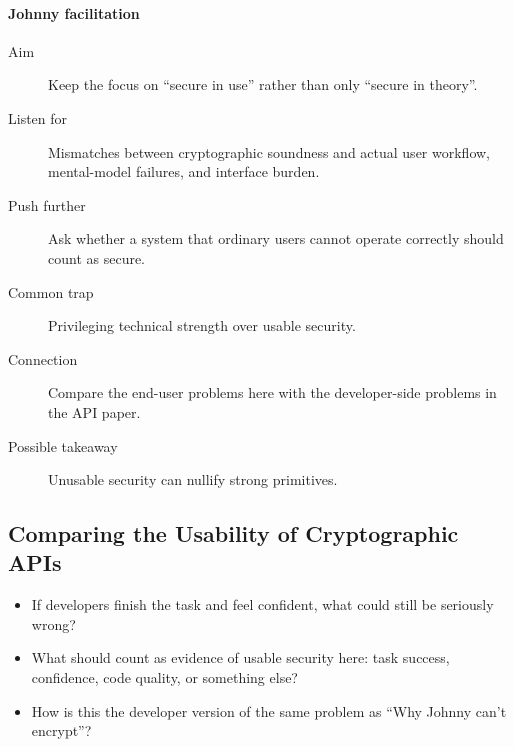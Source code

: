 \paragraph{Johnny facilitation}
\begin{description}
  \item[Aim] Keep the focus on \enquote{secure in use} rather than only
    \enquote{secure in theory}.
  \item[Listen for] Mismatches between cryptographic soundness and actual user
    workflow, mental-model failures, and interface burden.
  \item[Push further] Ask whether a system that ordinary users cannot operate
    correctly should count as secure.
  \item[Common trap] Privileging technical strength over usable security.
  \item[Connection] Compare the end-user problems here with the developer-side
    problems in the API paper.
  \item[Possible takeaway] Unusable security can nullify strong primitives.
\end{description}

\subsection{Comparing the Usability of Cryptographic APIs}

\begin{frame}
  \begin{question}
    \begin{itemize}
      \item If developers finish the task and feel confident, what could still
        be seriously wrong?
      \item What should count as evidence of usable security here: task
        success, confidence, code quality, or something else?
      \item How is this the developer version of the same problem as
        \enquote{Why Johnny can't encrypt}?
    \end{itemize}
  \end{question}
\end{frame}

